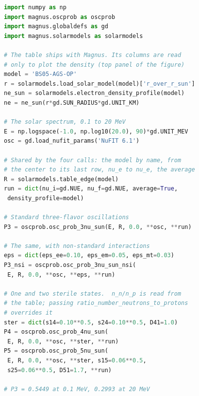 \documentclass[final,5p,times,twocolumn,sort,compress]{elsarticle}
\makeatletter
\newcommand{\eq}{Eq.}
\newcommand{\fig}{Fig.}
\DeclareRobustCommand{\_}{%
  \ifmmode\nfss@text{\textunderscore}\else\textunderscore\allowbreak\fi}
\newcommand{\equ}[1]{\eq~(\ref{equ:#1})}
\newcommand{\figu}[1]{\fig~\ref{fig:#1}}
\newcommand{\magnus}{{\tt Mag}\ensuremath{\nu}{\tt s}}
\makeatother
\begin{document}
\begin{lstlisting}[language=Python, caption={\textbf{Averaged solar probabilities.} The four averaged solar probabilities of \figu{solar}, runnable as it stands: the BS2005-AGS,OP table\ \cite{Bahcall:2004pz} ships with \magnus, and every Sun wrapper takes it by name through {\tt density\_profile}. The same keywords serve the four wrappers. The keyword {\tt average=True} is the only difference from an instantaneous call: it returns \equ{averaged_varying} from the eigenbases at the ends of the ray, without propagating the phase. The four curves take about three seconds. Naming {\tt 'B16-GS98'} instead gives its curve in \figu{solar_models}. See notebooks \#10, \#13, and \#28, and Sec.~\ref{sec:sun} for details.}, label={lst:sun}, float=tbp]
import numpy as np
import magnus.oscprob as oscprob
import magnus.globaldefs as gd
import magnus.solarmodels as solarmodels

# The table ships with Magnus. Its columns are read
# only to plot the density (top panel of the figure)
model = 'BS05-AGS-OP'
r = solarmodels.load_solar_model(model)['r_over_r_sun']
ne_sun = solarmodels.electron_density_profile(model)
ne = ne_sun(r*gd.SUN_RADIUS*gd.UNIT_KM)

# The solar spectrum, 0.1 to 20 MeV
E = np.logspace(-1.0, np.log10(20.0), 90)*gd.UNIT_MEV
osc = gd.load_nufit_params('NuFIT 6.1')

# Shared by the four calls: the model by name, from
# the center to its last row, nu_e to nu_e, the average
R = solarmodels.table_edge(model)
run = dict(nu_i=gd.NUE, nu_f=gd.NUE, average=True,
 density_profile=model)

# Standard three-flavor oscillations
P3 = oscprob.osc_prob_3nu_sun(E, R, 0.0, **osc, **run)

# The same, with non-standard interactions
eps = dict(eps_ee=0.10, eps_em=0.05, eps_mt=0.03)
P3_nsi = oscprob.osc_prob_3nu_sun_nsi(
 E, R, 0.0, **osc, **eps, **run)

# One and two sterile states.  n_n/n_p is read from
# the table; passing ratio_number_neutrons_to_protons
# overrides it
ster = dict(s14=0.10**0.5, s24=0.10**0.5, D41=1.0)
P4 = oscprob.osc_prob_4nu_sun(
 E, R, 0.0, **osc, **ster, **run)
P5 = oscprob.osc_prob_5nu_sun(
 E, R, 0.0, **osc, **ster, s15=0.06**0.5,
 s25=0.06**0.5, D51=1.7, **run)

# P3 = 0.5449 at 0.1 MeV, 0.2993 at 20 MeV
\end{lstlisting}
\end{document}
